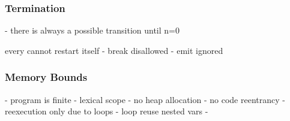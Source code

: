 \subsubsection*{Termination}

- there is always a possible transition until n=0

every cannot restart itself
    - break disallowed
    - emit ignored

\subsubsection*{Memory Bounds}

- program is finite
- lexical scope
    - no heap allocation
- no code reentrancy
    - reexecution only due to loops
    - loop reuse nested vars
- 
